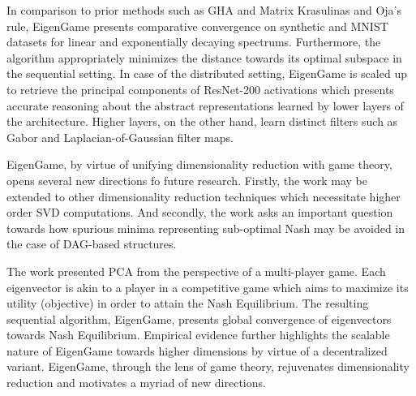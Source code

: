 \documentclass[11pt,letterpaper]{article}
\begin{document}
In comparison to prior methods such as GHA and Matrix Krasulinas and Oja's rule, EigenGame presents comparative convergence on synthetic and MNIST datasets for linear and exponentially decaying spectrums. Furthermore, the algorithm appropriately minimizes the distance towards its optimal subspace in the sequential setting. In case of the distributed setting, EigenGame is scaled up to retrieve the principal components of ResNet-200 activations which presents accurate reasoning about the abstract representations learned by lower layers of the architecture. Higher layers, on the other hand, learn distinct filters such as Gabor and Laplacian-of-Gaussian filter maps. 

EigenGame, by virtue of unifying dimensionality reduction with game theory, opens several new directions fo future research. Firstly, the work may be extended to other dimensionality reduction techniques which necessitate higher order SVD computations. And secondly, the work asks an important question towards how spurious minima representing sub-optimal Nash may be avoided in the case of DAG-based structures.

The work presented PCA from the perspective of a multi-player game. Each eigenvector is akin to a player in a competitive game which aims to maximize its utility (objective) in order to attain the Nash Equilibrium. The resulting sequential algorithm, EigenGame, presents global convergence of eigenvectors towards Nash Equilibrium. Empirical evidence further highlights the scalable nature of EigenGame towards higher dimensions by virtue of a decentralized variant. EigenGame, through the lens of game theory, rejuvenates dimensionality reduction and motivates a myriad of new directions. 
\end{document}
